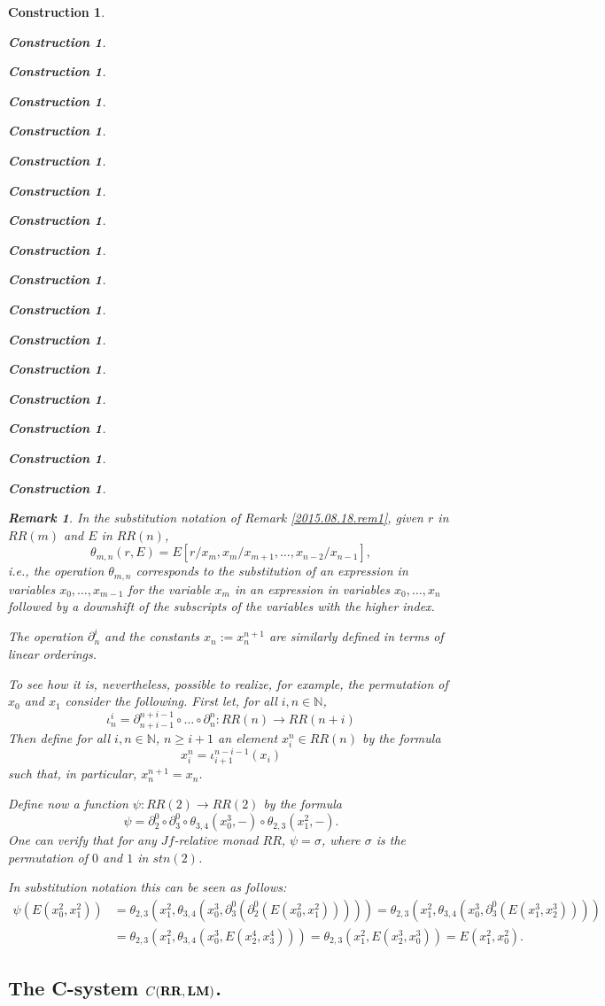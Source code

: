 \documentclass[onecolumn,12pt]{amsart}
\newtheorem{remark}[proposition]{Remark}
\numberwithin{proposition}{subsection}
\newtheorem{construction}[proposition]{Construction}
\newcommand{\sr}{\rightarrow}
\newcommand{\nn}{{\mathbb N}}
\newcommand{\nat}{\nn}
\newcommand{\RR}{{\bf RR}}
\newcommand{\LM}{{\bf LM}}
\begin{document}
\begin{construction}
\begin{construction}
\begin{construction}
\begin{construction}
\begin{construction}
\begin{construction}
\begin{construction}
\begin{construction}
\begin{construction}
\begin{construction}
\begin{construction}
\begin{construction}
\begin{construction}
\begin{construction}
\begin{construction}
\begin{construction}
\begin{construction}
\begin{remark}
In the substitution notation of Remark \ref{2015.08.18.rem1}, given $r$ in
$RR(m)$ and $E$ in $RR(n)$,
%
$$\theta_{m,n}(r,E)=E[r/x_m,x_m/x_{m+1},\dots,x_{n-2}/x_{n-1}],$$
%
i.e., the operation $\theta_{m,n}$ corresponds to the substitution of an
expression in variables $x_0,\dots,x_{m-1}$ for the variable $x_m$ in an
expression in variables $x_0,\dots,x_n$ followed by a downshift of the subscripts
of the variables with the higher index.

The operation $\partial_n^i$ and the constants $x_n:=x^{n+1}_{n}$ are similarly
defined in terms of linear orderings.

To see how it is, nevertheless, possible to realize, for example, the
permutation of $x_0$ and $x_1$ consider the following. First let, for all
$i,n\in\nat$,
%
$$\iota_n^i=\partial_{n+i-1}^{n+i-1}\circ \dots\circ \partial_n^n:RR(n)\sr RR(n+i)$$
%
Then define for all $i,n\in\nat$, $n\ge i+1$ an element $x^n_i\in RR(n)$ by the formula
%
$$x^n_i=\iota_{i+1}^{n-i-1}(x_i)$$
%
such that, in particular, $x^{n+1}_{n}=x_n$.

Define now a function $\psi:RR(2)\sr RR(2)$ by the formula
%
\[\psi=\partial^0_2\circ \partial^0_3\circ \theta_{3,4}(x_0^3,-)\circ \theta_{2,3}(x_1^2,-).\]
%
One can verify that for any $Jf$-relative monad $RR$, $\psi=\sigma$, where
$\sigma$ is the permutation of $0$ and $1$ in $stn(2)$.

In substitution notation this can be seen as follows:
\begin{equation*}
  \begin{split}
    \psi(E(x^2_0,x_1^2))&=\theta_{2,3}(x_1^2,\theta_{3,4}(x_0^3,\partial^0_3(\partial^0_2(E(x^2_0,x_1^2)))))=\theta_{2,3}(x_1^2,\theta_{3,4}(x_0^3,\partial^0_3(E(x^3_1,x^3_2))))
    \\&=\theta_{2,3}(x_1^2,\theta_{3,4}(x_0^3,E(x^4_2,x^4_3)))=\theta_{2,3}(x_1^2,E(x^3_2,x^3_0))=E(x^2_1,x^2_0).
  \end{split}
\end{equation*}
\end{remark}
%

\subsection{The C-system $C(\RR,\LM)$.}
%
\label{CRRLM}


\end{construction}
\end{construction}
\end{construction}
\end{construction}
\end{construction}
\end{construction}
\end{construction}
\end{construction}
\end{construction}
\end{construction}
\end{construction}
\end{construction}
\end{construction}
\end{construction}
\end{construction}
\end{construction}
\end{construction}
\end{document}
